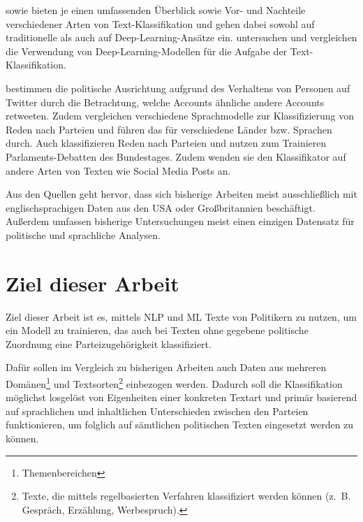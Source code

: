 \textcite{li_survey_2021} sowie \textcite{kowsari_text_2019} bieten je einen umfassenden Überblick sowie Vor- und Nachteile verschiedener Arten von Text-Klassifikation und gehen dabei sowohl auf traditionelle als auch auf Deep-Learning-Ansätze ein.
\textcite{minaee_deep_2022} untersuchen und vergleichen die Verwendung von Deep-Learning-Modellen für die Aufgabe der Text-Klassifikation.

\textcite{wong_quantifying_2016} bestimmen die politische Ausrichtung aufgrund des Verhaltens von Personen auf Twitter durch die Betrachtung, welche Accounts ähnliche andere Accounts retweeten.
Zudem vergleichen \textcite{doan_using_2022} verschiedene Sprachmodelle zur Klassifizierung von Reden nach Parteien und führen das für verschiedene Länder bzw. Sprachen durch.
Auch \textcite{biessmann_predicting_2016} klassifizieren Reden nach Parteien und nutzen zum Trainieren Parlaments-Debatten des Bundestages. Zudem wenden sie den Klassifikator auf andere Arten von Texten wie Social Media Posts an.

Aus den Quellen geht hervor, dass sich bisherige Arbeiten meist ausschließlich mit englischsprachigen Daten aus den USA oder Großbritannien beschäftigt. Außerdem umfassen bisherige Untersuchungen meist einen einzigen Datensatz für politische und sprachliche Analysen.

\section{Ziel dieser Arbeit} \label{sec:thesisGoal}


Ziel dieser Arbeit ist es, mittels \ac{NLP} und \ac{ML} Texte von Politikern zu nutzen, um ein Modell zu trainieren, das auch bei Texten ohne gegebene politische Zuordnung eine Parteizugehörigkeit klassifiziert. 


Dafür sollen im Vergleich zu bisherigen Arbeiten auch Daten aus mehreren Domänen\footnote{Themenbereichen} und Textsorten\footnote{Texte, die mittels regelbasierten Verfahren klassifiziert werden können (z. B. Gespräch, Erzählung, Werbespruch).} einbezogen werden. Dadurch soll die Klassifikation möglichst losgelöst von Eigenheiten einer konkreten Textart und primär basierend auf sprachlichen und inhaltlichen Unterschieden zwischen den Parteien funktionieren, um folglich auf sämtlichen politischen Texten eingesetzt werden zu können.

